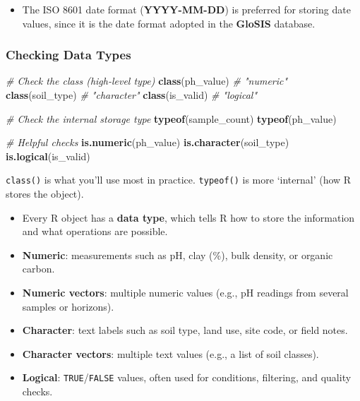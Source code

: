 \documentclass[
  10pt,
  b5paper,
  oneside]{book}
\newenvironment{Shaded}{\begin{snugshade}}{\end{snugshade}}
\newcommand{\CommentTok}[1]{\textcolor[rgb]{0.56,0.35,0.01}{\textit{#1}}}
\newcommand{\FunctionTok}[1]{\textcolor[rgb]{0.13,0.29,0.53}{\textbf{#1}}}
\newcommand{\NormalTok}[1]{#1}
\providecommand{\tightlist}{%
  \setlength{\itemsep}{0pt}\setlength{\parskip}{0pt}}
\begin{document}
\begin{itemize}
\tightlist
\item
  The ISO 8601 date format (\textbf{YYYY-MM-DD}) is preferred for storing date values, since it is the date format adopted in the \textbf{GloSIS} database.
\end{itemize}

\subsubsection{Checking Data Types}\label{check-data}

\begin{Shaded}
\begin{Highlighting}[]
\CommentTok{\# Check the class (high{-}level type)}
\FunctionTok{class}\NormalTok{(ph\_value)   }\CommentTok{\# "numeric"}
\FunctionTok{class}\NormalTok{(soil\_type)  }\CommentTok{\# "character"}
\FunctionTok{class}\NormalTok{(is\_valid)   }\CommentTok{\# "logical"}

\CommentTok{\# Check the internal storage type}
\FunctionTok{typeof}\NormalTok{(sample\_count)}
\FunctionTok{typeof}\NormalTok{(ph\_value)}

\CommentTok{\# Helpful checks}
\FunctionTok{is.numeric}\NormalTok{(ph\_value)}
\FunctionTok{is.character}\NormalTok{(soil\_type)}
\FunctionTok{is.logical}\NormalTok{(is\_valid)}
\end{Highlighting}
\end{Shaded}

\texttt{class()} is what you'll use most in practice. \texttt{typeof()} is more `internal' (how R stores the object).

\begin{itemize}
\item
  Every R object has a \textbf{data type}, which tells R how to store the information and what operations are possible.
\item
  \textbf{Numeric}: measurements such as pH, clay (\%), bulk density, or organic carbon.
\item
  \textbf{Numeric vectors}: multiple numeric values (e.g., pH readings from several samples or horizons).
\item
  \textbf{Character}: text labels such as soil type, land use, site code, or field notes.
\item
  \textbf{Character vectors}: multiple text values (e.g., a list of soil classes).
\item
  \textbf{Logical}: \texttt{TRUE}/\texttt{FALSE} values, often used for conditions, filtering, and quality checks.
\end{itemize}
\end{document}
